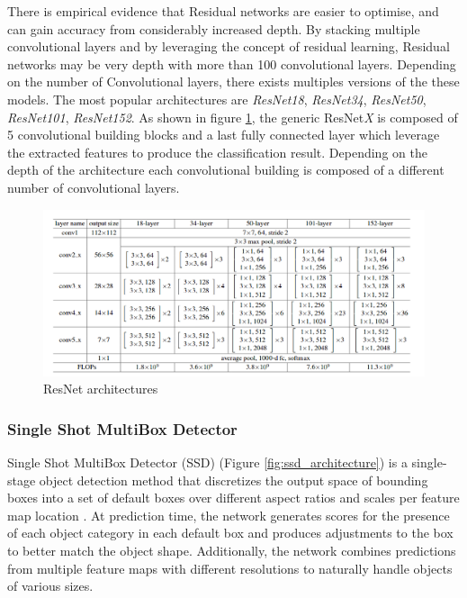 There is empirical evidence that Residual networks are easier to optimise, and can gain accuracy from considerably increased depth. By stacking multiple convolutional layers and by leveraging the concept of residual learning, Residual networks may be very depth with more than 100 convolutional layers. Depending on the number of Convolutional layers, there exists multiples versions of the these models. The most popular architectures are \textit{ResNet18}, \textit{ResNet34}, \textit{ResNet50}, \textit{ResNet101}, \textit{ResNet152}. As shown in figure \ref{fig:resnet_architectures}, the generic ResNet\textit{X} is composed of 5 convolutional building blocks and a last fully connected layer which leverage the extracted features to produce the classification result. Depending on the depth of the architecture each convolutional building is composed of a different number of convolutional layers.

\begin{figure}
\centerline{\includegraphics[scale=0.4]{images/chapter_2/resnet.png}}
\caption{ResNet architectures \citep{he2016deep}}
\label{fig:resnet_architectures}
\end{figure}


\subsubsection{Single Shot MultiBox Detector}

Single Shot MultiBox Detector (SSD) (Figure \ref{fig:ssd_architecture}) is a single-stage object detection method that discretizes the output space of bounding boxes into a set of default boxes over different aspect ratios and scales per feature map location \citep{liu2016ssd}. At prediction time, the network generates scores for the presence of each object category in each default box and produces adjustments to the box to better match the object shape. Additionally, the network combines predictions from multiple feature maps with different resolutions to naturally handle objects of various sizes.

